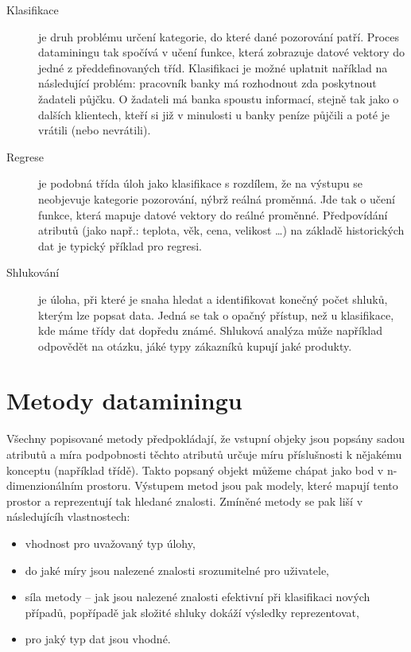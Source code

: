 \documentclass[thesis=M,czech]{FITthesis}[2012/06/26]
\begin{document}
\begin{description}
    \item[Klasifikace]
    
    je druh problému určení kategorie, do které dané pozorování patří. Proces dataminingu tak spočívá v učení funkce, která zobrazuje datové vektory do jedné z předdefinovaných tříd. Klasifikaci je možné uplatnit naříklad na následující problém: pracovník 
    banky má rozhodnout zda poskytnout žadateli půjčku. O žadateli má banka spoustu informací, stejně tak jako o dalších klientech, kteří si již v minulosti u banky peníze půjčili a poté je vrátili (nebo nevrátili).
    
    
    \item[Regrese]
    
    je podobná třída úloh jako klasifikace s rozdílem, že na výstupu se neobjevuje kategorie pozorování, nýbrž reálná proměnná. Jde tak o učení funkce, která mapuje datové vektory do reálné proměnné. Předpovídání atributů (jako např.: teplota, věk, cena, velikost \dots) na základě historických dat je typický příklad pro regresi.
    

   \item[Shlukování]
   
   je úloha, při které je snaha hledat a identifikovat konečný počet shluků, kterým lze popsat data. Jedná se tak o opačný přístup, než u klasifikace, kde máme třídy dat dopředu známé. Shluková analýza může například odpovědět na otázku, jáké typy zákazníků kupují jaké produkty.
   
\end{description}


 \section{Metody dataminingu}
Všechny popisované metody předpokládají, že vstupní objeky jsou popsány sadou atributů a míra podpobnosti těchto atributů určuje míru příslušnosti k nějakému konceptu (například třídě). Takto popsaný objekt můžeme chápat jako bod v n-dimenzionálním prostoru. Výstupem metod jsou pak modely, které mapují tento prostor a reprezentují tak hledané znalosti.
Zmíněné metody se pak liší v následujícíh vlastnostech:


\begin{itemize}
\item vhodnost pro uvažovaný typ úlohy,
\item do jaké míry jsou nalezené znalosti srozumitelné pro uživatele,
\item síla metody -- jak jsou nalezené znalosti efektivní při klasifikaci nových případů, popřípadě jak složité shluky dokáží výsledky reprezentovat,
\item pro jaký typ dat jsou vhodné.
\end{itemize}
\end{document}
